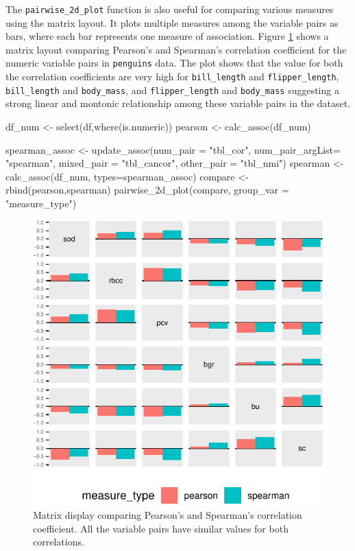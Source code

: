 The \texttt{pairwise\_2d\_plot} function is also useful for comparing
various measures using the matrix layout. It plots multiple measures
among the variable pairs as bars, where each bar represents one measure
of association. Figure \ref{fig:compare-matrix} shows a matrix layout
comparing Pearson's and Spearman's correlation coefficient for the
numeric variable pairs in \texttt{penguins} data. The plot shows that
the value for both the correlation coefficients are very high for
\texttt{bill\_length} and \texttt{flipper\_length},
\texttt{bill\_length} and \texttt{body\_mass}, and
\texttt{flipper\_length} and \texttt{body\_mass} suggesting a strong
linear and montonic relationship among these variable pairs in the
dataset.

\begin{Schunk}
\begin{Sinput}
df_num <- select(df,where(is.numeric))
pearson <- calc_assoc(df_num)

spearman_assoc <- update_assoc(num_pair = "tbl_cor",
                               num_pair_argList= "spearman",
                               mixed_pair = "tbl_cancor",
                               other_pair = "tbl_nmi")
spearman <- calc_assoc(df_num, types=spearman_assoc)
compare <- rbind(pearson,spearman)
pairwise_2d_plot(compare, group_var = "measure_type")
\end{Sinput}
\begin{figure}

{\centering \includegraphics{rj_paper_files/figure-latex/compare-matrix-1} 

}

\caption[Matrix display comparing Pearson's and Spearman's correlation coefficient]{Matrix display comparing Pearson's and Spearman's correlation coefficient. All the variable pairs have similar values for both correlations.}\label{fig:compare-matrix}
\end{figure}
\end{Schunk}


